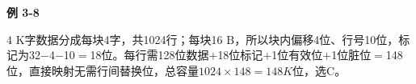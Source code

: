 {\color{ink}\bfseries 例 3-8}\par\vspace{1bp}4 K字数据分成每块4字，共1024行；每块16 B，所以块内偏移4位、行号10位，标记为32\(-\)4\(-\)10\(=\allowbreak{}\)18位。每行需128位数据\(+\allowbreak{}\)18位标记\(+\allowbreak{}\)1位有效位\(+\allowbreak{}\)1位脏位\(=\allowbreak{}\)148位，直接映射无需行间替换位，总容量\(1024\times 148=\allowbreak{}148 K\)位，选C。
